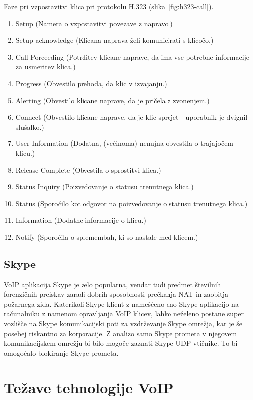 \documentclass{acm_proc_article-sp}
\begin{document}
Faze pri vzpostavitvi klica pri protokolu H.323 (slika~\ref{fig:h323-call}).
\begin{enumerate}
  \item Setup (Namera o vzpostavitvi povezave z napravo.)
  \item Setup acknowledge (Klicana naprava želi komunicirati s klicočo.)
  \item Call Porceeding (Potrditev klicane naprave, da ima vse potrebne informacije za usmeritev klica.)
  \item Progress (Obvestilo prehoda, da klic v izvajanju.)
  \item Alerting (Obvestilo klicane naprave, da je pričela z zvonenjem.)
  \item Connect (Obvestilo klicane naprave, da je klic sprejet - uporabnik je dvignil slušalko.)
  \item User Information (Dodatna, (večinoma) nenujna obvestila o trajajočem klicu.)
  \item Release Complete (Obvestila o sprostitvi klica.)
  \item Status Inquiry (Poizvedovanje o statusu trenutnega klica.)
  \item Status (Sporočilo kot odgovor na poizvedovanje o statusu trenutnega klica.)
  \item Information (Dodatne informacije o klicu.)
  \item Notify (Sporočila o spremembah, ki so nastale med klicem.)
\end{enumerate}


\subsection{Skype}
VoIP aplikacija Skype je zelo popularna, vendar tudi predmet številnih forenzičnih preiskav zaradi dobrih sposobnosti prečkanja NAT in zaobitja požarnega zida. Katerikoli Skype klient z nameščeno eno Skype aplikacijo na računalniku z namenom opravljanja VoIP klicev, lahko neželeno postane super vozlišče na Skype komunikacijski poti za vzdrževanje Skype omrežja, kar je še posebej riskantno za korporacije. Z analizo samo Skype prometa v njegovem komunikacijskem omrežju bi bilo mogoče zaznati Skype UDP vtičnike. To bi omogočalo blokiranje Skype prometa.

\section{Težave tehnologije VoIP}
\end{document}

